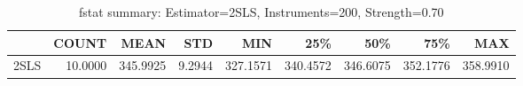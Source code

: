 \begin{table}[ht]
\centering
\caption{fstat summary: Estimator=2SLS, Instruments=200, Strength=0.70}
\begin{tabular}{lrrrrrrrr}
\toprule
 & COUNT & MEAN & STD & MIN & 25\% & 50\% & 75\% & MAX \\
\midrule
2SLS & 10.0000 & 345.9925 & 9.2944 & 327.1571 & 340.4572 & 346.6075 & 352.1776 & 358.9910 \\
\bottomrule
\end{tabular}
\end{table}
